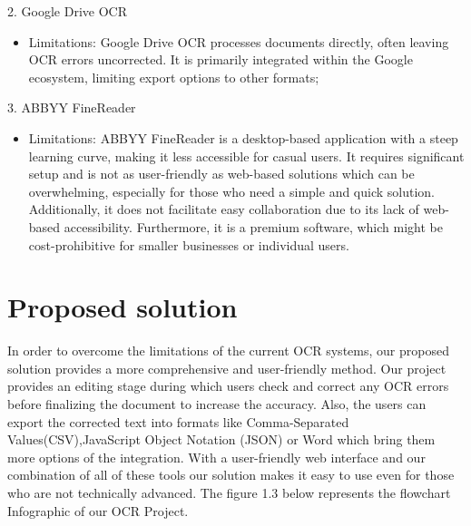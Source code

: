 2. Google Drive OCR
\begin{itemize}
    \item Limitations: Google Drive OCR processes documents directly, often leaving OCR errors uncorrected. It is primarily integrated within the Google ecosystem, limiting export options to other formats;
\end{itemize}

 3. ABBYY FineReader
 \begin{itemize}
     \item Limitations: ABBYY FineReader is a desktop-based application with a steep learning curve, making it less accessible for casual users. It requires significant setup and is not as user-friendly as web-based solutions which can be overwhelming, especially for those who need a simple and quick solution. Additionally, it does not facilitate easy collaboration due to its lack of web-based accessibility. Furthermore, it is a premium software, which might be cost-prohibitive for smaller businesses or individual users. 
\end{itemize}

\section{Proposed solution   }
In order to overcome the limitations of the current OCR systems, our proposed solution provides a more comprehensive and user-friendly method. Our project provides an editing stage during which users check and correct any OCR errors before finalizing the document to increase the accuracy. Also, the users can export the corrected text into formats like Comma-Separated Values(CSV),JavaScript Object Notation (JSON) or Word which bring them more options of the integration. With a user-friendly web interface and our combination of all of these tools our solution makes it easy to use even for those who are not technically advanced.
The figure 1.3 below represents the flowchart Infographic of our OCR Project.

